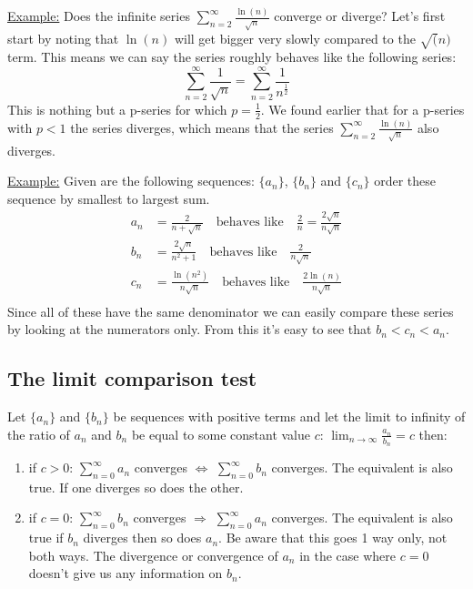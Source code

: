 \documentclass[11pt, a4paper]{article}
\numberwithin{equation}{section}
\numberwithin{figure}{section}
\begin{document}
\underline{Example:} Does the infinite series $\sum_{n=2}^\infty \frac{\ln(n)}{\sqrt{n}}$ converge or diverge?
Let's first start by noting that $\ln(n)$ will get bigger very slowly compared to the $\sqrt(n)$ term. This means we can say the series roughly behaves like the following series:
\begin{equation*}
  \sum_{n=2}^\infty \frac{1}{\sqrt{n}} = \sum_{n=2}^\infty \frac{1}{n^{\frac{1}{2}}}
\end{equation*}
This is nothing but a p-series for which $p=\frac{1}{2}$. We found earlier that for a p-series with $p<1$ the series diverges, which means that the series $\sum_{n=2}^\infty \frac{\ln(n)}{\sqrt{n}}$ also diverges.

\underline{Example:} Given are the following sequences: $\{ a_n \}$, $\{ b_n \}$ and $\{ c_n \}$ order these sequence by smallest to largest sum.
\begin{align*}
  a_n &= \frac{2}{n + \sqrt{n}} \quad \text{behaves like} \quad \frac{2}{n} = \frac{2\sqrt{n}}{n\sqrt{n}}\\
  b_n &= \frac{2\sqrt{n}}{n^2 + 1} \quad \text{behaves like} \quad \frac{2}{n\sqrt{n}}\\
  c_n &= \frac{\ln(n^2)}{n\sqrt{n}} \quad \text{behaves like} \quad \frac{2\ln(n)}{n\sqrt{n}}\\
\end{align*}
Since all of these have the same denominator we can easily compare these series by looking at the numerators only. From this it's easy to see that $b_n < c_n < a_n$.


\subsection{The limit comparison test}
Let $\{ a_n \}$ and $\{ b_n \}$ be sequences with positive terms and let the limit to infinity of the ratio of $a_n$ and $b_n$ be equal to some constant value $c$: $\lim_{n\to\infty} \frac{a_n}{b_n}=c$ then:
\begin{enumerate}
  \item if $c>0$: $\sum_{n=0}^\infty a_n$ converges $\Leftrightarrow$ $\sum_{n=0}^\infty b_n$ converges. The equivalent is also true. If one diverges so does the other.
  \item if $c=0$: $\sum_{n=0}^\infty b_n$ converges $\Rightarrow$  $\sum_{n=0}^\infty a_n$ converges. The equivalent is also true if $b_n$ diverges then so does $a_n$. Be aware that this goes 1 way only, not both ways. The divergence or convergence of $a_n$ in the case where $c=0$ doesn't give us any information on $b_n$.
\end{enumerate}
\end{document}
